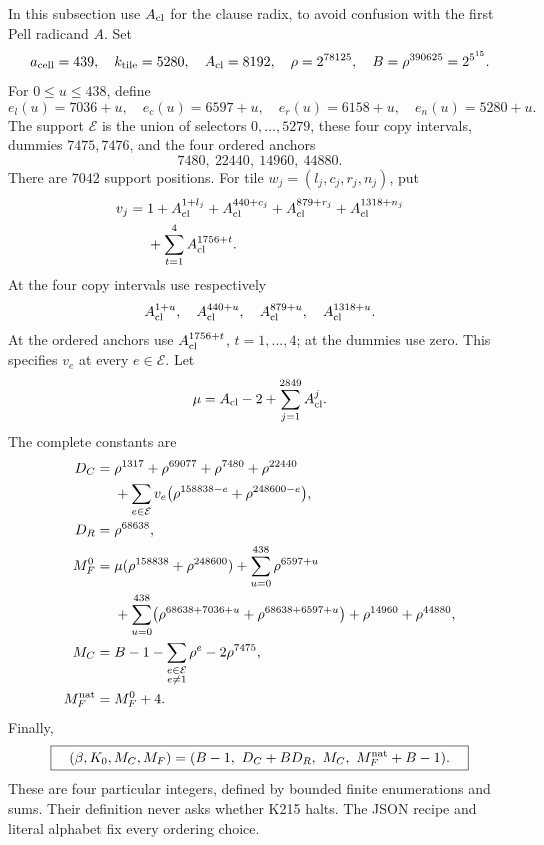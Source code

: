 \documentclass[11pt]{article}
\theoremstyle{remark}\newtheorem{remark}[theorem]{Remark}
\begin{document}
In this subsection use \(A_{\rm cl}\) for the clause radix, to avoid
confusion with the first Pell radicand \(A\).
Set
\[
 a_{\rm cell}=439,\quad k_{\rm tile}=5280,\quad
 A_{\rm cl}=8192,\quad \rho=2^{78125},\quad
 B=\rho^{390625}=2^{5^{15}}.
\]
For \(0\le u\le438\), define
\[
 e_l(u)=7036+u,\quad e_c(u)=6597+u,\quad
 e_r(u)=6158+u,\quad e_n(u)=5280+u.
\]
The support \(\mathcal E\) is the union of selectors \(0,\ldots,5279\),
these four copy intervals, dummies \(7475,7476\), and the four
ordered anchors
\[
 7480,\ 22440,\ 14960,\ 44880.
\]
There are \(7042\) support positions.
For tile \(w_j=(l_j,c_j,r_j,n_j)\), put
\begin{align*}
 v_j={}&1+A_{\rm cl}^{1+l_j}+A_{\rm cl}^{440+c_j}
          +A_{\rm cl}^{879+r_j}+A_{\rm cl}^{1318+n_j}\\
       &+\sum_{t=1}^4 A_{\rm cl}^{1756+t}.
\end{align*}
At the four copy intervals use respectively
\[
 A_{\rm cl}^{1+u},\quad A_{\rm cl}^{440+u},\quad
 A_{\rm cl}^{879+u},\quad A_{\rm cl}^{1318+u}.
\]
At the ordered anchors use \(A_{\rm cl}^{1756+t}\), \(t=1,\ldots,4\);
at the dummies use zero. This specifies \(v_e\) at every \(e\in\mathcal E\).
Let
\[
 \mu=A_{\rm cl}-2+\sum_{j=1}^{2849}A_{\rm cl}^j.
\]
The complete constants are
\begin{align*}
 D_C={}&\rho^{1317}+\rho^{69077}+\rho^{7480}+\rho^{22440}\\
       &+\sum_{e\in\mathcal E}v_e
              \bigl(\rho^{158838-e}+\rho^{248600-e}\bigr),\\
 D_R={}&\rho^{68638},\\
 M_F^0={}&\mu(\rho^{158838}+\rho^{248600})
                   +\sum_{u=0}^{438}\rho^{6597+u}\\
       &+\sum_{u=0}^{438}
          \bigl(\rho^{68638+7036+u}+\rho^{68638+6597+u}\bigr)
          +\rho^{14960}+\rho^{44880},\\
 M_C={}&B-1-\sum_{\substack{e\in\mathcal E\\e\ne1}}\rho^e
                                       -2\rho^{7475},\\
 M_F^{\rm nat}={}&M_F^0+4.
\end{align*}
Finally,
\begin{equation}\label{eq:tuple}
 \boxed{\quad
 (\beta,K_0,M_C,M_F)
   =(B-1,\ D_C+BD_R,\ M_C,\ M_F^{\rm nat}+B-1).
 \quad}
\end{equation}
These are four particular integers, defined by bounded finite
enumerations and sums. Their definition never asks whether K215
halts. The JSON recipe and literal alphabet fix every ordering choice.
\end{document}
